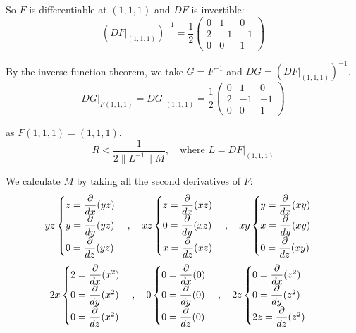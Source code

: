 \documentclass[11pt]{article}
\begin{document}
So $F$ is differentiable at $(1,1,1)$ and $DF$ is invertible:
\[
\left(DF \big|_{(1,1,1)}\right)^{-1} = \frac{1}{2} \begin{pmatrix}
    0 & 1 & 0 \\
    2 & -1 & -1 \\
    0 & 0 & 1
\end{pmatrix}
\]

By the inverse function theorem, we take $G = F^{-1}$ and $DG = \left(DF \big|_{(1,1,1)}\right)^{-1}$.
\[
DG \big|_{F(1,1,1)} = DG \big|_{(1,1,1)} = \frac{1}{2} \begin{pmatrix}
    0 & 1 & 0 \\
    2 & -1 & -1 \\
    0 & 0 & 1
\end{pmatrix}
\]

as $F(1,1,1) = (1,1,1)$.
\[
R < \frac{1}{2 \|L^{-1}\| M}, \quad \text{where } L = DF \big|_{(1,1,1)}
\]

We calculate $M$ by taking all the second derivatives of $F$:
\[
yz \space
\begin{cases}
    z = \dfrac{\partial}{dx} (yz) \\
    y = \dfrac{\partial}{dy} (yz) \\
    0 = \dfrac{\partial}{dz} (yz)
\end{cases}, \quad
xz \space
\begin{cases}
    z = \dfrac{\partial}{dx} (xz) \\
    0 = \dfrac{\partial}{dy} (xz) \\
    x = \dfrac{\partial}{dz} (xz)
\end{cases}, \quad
xy \space
\begin{cases}
    y = \dfrac{\partial}{dx} (xy) \\
    x = \dfrac{\partial}{dy} (xy) \\
    0 = \dfrac{\partial}{dz} (xy)
\end{cases}
\]
\[
2x \space
\begin{cases}
    2 = \dfrac{\partial}{dx} (x^2) \\
    0 = \dfrac{\partial}{dy} (x^2) \\
    0 = \dfrac{\partial}{dz} (x^2)
\end{cases}, \quad
0 \space
\begin{cases}
    0 = \dfrac{\partial}{dx} (0) \\
    0 = \dfrac{\partial}{dy} (0) \\
    0 = \dfrac{\partial}{dz} (0)    
\end{cases}, \quad
2z \space
\begin{cases}
    0 = \dfrac{\partial}{dx} (z^2) \\
    0 = \dfrac{\partial}{dy} (z^2) \\
    2z = \dfrac{\partial}{dz} (z^2)
\end{cases} 
\]
\end{document}
